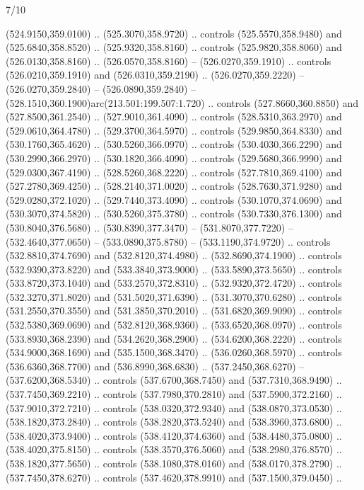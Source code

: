 \begin{flagdescription}{7/10}
\begin{scope}[xshift=0.5\flaglength]
\begin{scope}[scale=0.00185\flagwidth,yshift=245mm,xshift=-43.7mm]
\begin{scope}[y=-0.8pt, x=0.8pt, inner sep=0pt, outer sep=0pt]
\begin{scope}[shift={(-344.0678,183.89831)}]
  (524.9150,359.0100) .. (525.3070,358.9720) .. controls (525.5570,358.9480) and
  (525.6840,358.8520) .. (525.9320,358.8160) .. controls (525.9820,358.8060) and
  (526.0130,358.8160) .. (526.0570,358.8160) -- (526.0270,359.1910) .. controls
  (526.0210,359.1910) and (526.0310,359.2190) .. (526.0270,359.2220) --
  (526.0270,359.2840) -- (526.0890,359.2840) --
  (528.1510,360.1900)arc(213.501:199.507:1.720) .. controls (527.8660,360.8850)
  and (527.8500,361.2540) .. (527.9010,361.4090) .. controls (528.5310,363.2970)
  and (529.0610,364.4780) .. (529.3700,364.5970) .. controls (529.9850,364.8330)
  and (530.1760,365.4620) .. (530.5260,366.0970) .. controls (530.4030,366.2290)
  and (530.2990,366.2970) .. (530.1820,366.4090) .. controls (529.5680,366.9990)
  and (529.0300,367.4190) .. (528.5260,368.2220) .. controls (527.7810,369.4100)
  and (527.2780,369.4250) .. (528.2140,371.0020) .. controls (528.7630,371.9280)
  and (529.0280,372.1020) .. (529.7440,373.4090) .. controls (530.1070,374.0690)
  and (530.3070,374.5820) .. (530.5260,375.3780) .. controls (530.7330,376.1300)
  and (530.8040,376.5680) .. (530.8390,377.3470) -- (531.8070,377.7220) --
  (532.4640,377.0650) -- (533.0890,375.8780) -- (533.1190,374.9720) .. controls
  (532.8810,374.7690) and (532.8120,374.4980) .. (532.8690,374.1900) .. controls
  (532.9390,373.8220) and (533.3840,373.9000) .. (533.5890,373.5650) .. controls
  (533.8720,373.1040) and (533.2570,372.8310) .. (532.9320,372.4720) .. controls
  (532.3270,371.8020) and (531.5020,371.6390) .. (531.3070,370.6280) .. controls
  (531.2550,370.3550) and (531.3850,370.2010) .. (531.6820,369.9090) .. controls
  (532.5380,369.0690) and (532.8120,368.9360) .. (533.6520,368.0970) .. controls
  (533.8930,368.2390) and (534.2620,368.2900) .. (534.6200,368.2220) .. controls
  (534.9000,368.1690) and (535.1500,368.3470) .. (536.0260,368.5970) .. controls
  (536.6360,368.7700) and (536.8990,368.6830) .. (537.2450,368.6270) --
  (537.6200,368.5340) .. controls (537.6700,368.7450) and (537.7310,368.9490) ..
  (537.7450,369.2210) .. controls (537.7980,370.2810) and (537.5900,372.2160) ..
  (537.9010,372.7210) .. controls (538.0320,372.9340) and (538.0870,373.0530) ..
  (538.1820,373.2840) .. controls (538.2820,373.5240) and (538.3960,373.6800) ..
  (538.4020,373.9400) .. controls (538.4120,374.6360) and (538.4480,375.0800) ..
  (538.4020,375.8150) .. controls (538.3570,376.5060) and (538.2980,376.8570) ..
  (538.1820,377.5650) .. controls (538.1080,378.0160) and (538.0170,378.2790) ..
  (537.7450,378.6270) .. controls (537.4620,378.9910) and (537.1500,379.0450) ..

\end{scope}
\end{scope}
\end{scope}
\end{scope}
\end{flagdescription}
